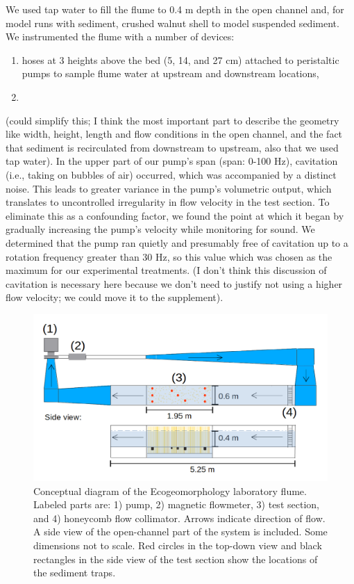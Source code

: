 \documentclass{scrreprt}
\begin{document}
We used tap water to fill the flume to 0.4 m depth in the open channel and, for model runs with sediment, crushed walnut shell to model suspended sediment. We instrumented the flume with a number of devices:

\begin{enumerate}
    \item hoses at 3 heights above the bed (5, 14, and 27 cm) attached to peristaltic pumps to sample flume water at upstream and downstream locations,
    \item 
\end{enumerate}

(could simplify this; I think the most important part to describe the geometry like width, height, length and flow conditions in the open channel, and the fact that sediment is recirculated from downstream to upstream, also that we used tap water). In the upper part of our pump's span (span: 0-100 Hz), cavitation (i.e., taking on bubbles of air) occurred, which was accompanied by a distinct noise. This leads to greater variance in the pump's volumetric output, which translates to uncontrolled irregularity in flow velocity in the test section. To eliminate this as a confounding factor, we found the point at which it began by gradually increasing the pump's velocity while monitoring for sound. We determined that the pump ran quietly and presumably free of cavitation up to a rotation frequency greater than 30 Hz, so this value which was chosen as the maximum for our experimental treatments. (I don't think this discussion of cavitation is necessary here because we don't need to justify not using a higher flow velocity; we could move it to the supplement).

\begin{figure}[htbp]
\includegraphics[width=15cm]{../pics/flume_with_sedtraps.png}
\centering
\caption{Conceptual diagram of the Ecogeomorphology laboratory flume. Labeled parts are: 1) pump, 2) magnetic flowmeter, 3) test section, and 4) honeycomb flow collimator. Arrows indicate direction of flow. A side view of the open-channel part of the system is included. Some dimensions not to scale. Red circles in the top-down view and black rectangles in the side view of the test section show the locations of the sediment traps.}
\label{fig:floorplan}
\end{figure}
\end{document}
